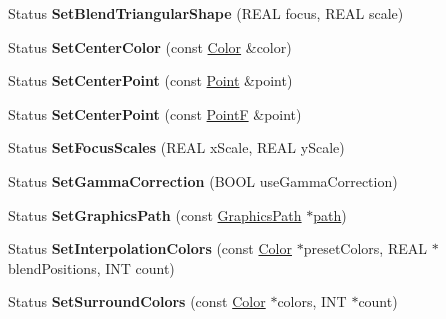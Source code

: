 \begin{DoxyCompactItemize}
\mbox{\label{class_path_gradient_brush_a3d92f39cbaeb51a6273a98317261b6cd}} 
Status {\bfseries Set\+Blend\+Triangular\+Shape} (R\+E\+AL focus, R\+E\+AL scale)
\item 
\mbox{\label{class_path_gradient_brush_a432aa091f05758e560cad8975eef505f}} 
Status {\bfseries Set\+Center\+Color} (const \hyperlink{struct_color}{Color} \&color)
\item 
\mbox{\label{class_path_gradient_brush_ae065fb20aa8ec728d989c415c43e5885}} 
Status {\bfseries Set\+Center\+Point} (const \hyperlink{struct_point}{Point} \&point)
\item 
\mbox{\label{class_path_gradient_brush_afb23a10cc5aad07dc0c17669f7645506}} 
Status {\bfseries Set\+Center\+Point} (const \hyperlink{struct_point_f}{PointF} \&point)
\item 
\mbox{\label{class_path_gradient_brush_ac5f99dd0b95b536a5df5940ccceabbc4}} 
Status {\bfseries Set\+Focus\+Scales} (R\+E\+AL x\+Scale, R\+E\+AL y\+Scale)
\item 
\mbox{\label{class_path_gradient_brush_abde8f0de65d5664c46c2a41fdcb6f32a}} 
Status {\bfseries Set\+Gamma\+Correction} (B\+O\+OL use\+Gamma\+Correction)
\item 
\mbox{\label{class_path_gradient_brush_aff737907d34764e2bc11c9f0a59bd022}} 
Status {\bfseries Set\+Graphics\+Path} (const \hyperlink{class_graphics_path}{Graphics\+Path} $\ast$\hyperlink{structpath}{path})
\item 
\mbox{\label{class_path_gradient_brush_a3f146abc2964926ed4b126423bca9f82}} 
Status {\bfseries Set\+Interpolation\+Colors} (const \hyperlink{struct_color}{Color} $\ast$preset\+Colors, R\+E\+AL $\ast$blend\+Positions, I\+NT count)
\item 
\mbox{\label{class_path_gradient_brush_ad605cb4db8ce9a4990fe14ea6e252037}} 
Status {\bfseries Set\+Surround\+Colors} (const \hyperlink{struct_color}{Color} $\ast$colors, I\+NT $\ast$count)

\end{DoxyCompactItemize}
